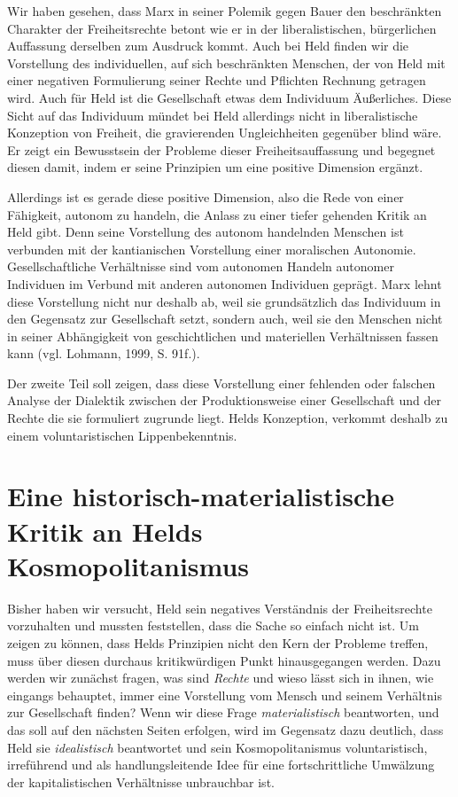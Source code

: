 \documentclass[ngerman,12pt, titlepage, smallheadings, nomath]{scrartcl}
\begin{document}
Wir haben gesehen, dass Marx in seiner Polemik gegen Bauer den
beschränkten Charakter der Freiheitsrechte betont wie er in der
liberalistischen, bürgerlichen Auffassung derselben zum Ausdruck kommt.
Auch bei Held finden wir die Vorstellung des individuellen, auf sich
beschränkten Menschen, der von Held mit einer negativen Formulierung
seiner Rechte und Pflichten Rechnung getragen wird. Auch für Held ist
die Gesellschaft etwas dem Individuum Äußerliches. Diese Sicht auf das
Individuum mündet bei Held allerdings nicht in liberalistische
Konzeption von Freiheit, die gravierenden Ungleichheiten gegenüber blind
wäre. Er zeigt ein Bewusstsein der Probleme dieser Freiheitsauffassung
und begegnet diesen damit, indem er seine Prinzipien um eine positive
Dimension ergänzt.

Allerdings ist es gerade diese positive Dimension, also die Rede von
einer Fähigkeit, autonom zu handeln, die Anlass zu einer tiefer gehenden
Kritik an Held gibt. Denn seine Vorstellung des autonom handelnden
Menschen ist verbunden mit der kantianischen Vorstellung einer
moralischen Autonomie. Gesellschaftliche Verhältnisse sind vom autonomen
Handeln autonomer Individuen im Verbund mit anderen autonomen Individuen
geprägt. Marx lehnt diese Vorstellung nicht nur deshalb ab, weil sie
grundsätzlich das Individuum in den Gegensatz zur Gesellschaft setzt,
sondern auch, weil sie den Menschen nicht in seiner Abhängigkeit von
geschichtlichen und materiellen Verhältnissen fassen kann (vgl. Lohmann,
1999, S. 91f.).

Der zweite Teil soll zeigen, dass diese Vorstellung einer fehlenden oder
falschen Analyse der Dialektik zwischen der Produktionsweise einer
Gesellschaft und der Rechte die sie formuliert zugrunde liegt. Helds
Konzeption, verkommt deshalb zu einem voluntaristischen
Lippenbekenntnis.

\section{Eine historisch-materialistische Kritik an Helds
Kosmopolitanismus}\label{eine-historisch-materialistische-kritik-an-helds-kosmopolitanismus}

Bisher haben wir versucht, Held sein negatives Verständnis der
Freiheitsrechte vorzuhalten und mussten feststellen, dass die Sache so
einfach nicht ist. Um zeigen zu können, dass Helds Prinzipien nicht den
Kern der Probleme treffen, muss über diesen durchaus kritikwürdigen
Punkt hinausgegangen werden. Dazu werden wir zunächst fragen, was sind
\emph{Rechte} und wieso lässt sich in ihnen, wie eingangs behauptet,
immer eine Vorstellung vom Mensch und seinem Verhältnis zur Gesellschaft
finden? Wenn wir diese Frage \emph{materialistisch} beantworten, und das
soll auf den nächsten Seiten erfolgen, wird im Gegensatz dazu deutlich,
dass Held sie \emph{idealistisch} beantwortet und sein Kosmopolitanismus
voluntaristisch, irreführend und als handlungsleitende Idee für eine
fortschrittliche Umwälzung der kapitalistischen Verhältnisse unbrauchbar
ist.
\end{document}
